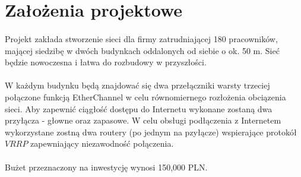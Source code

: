 \section{Założenia projektowe}
\paragraph{}
Projekt zakłada stworzenie sieci dla firmy zatrudniającej 180 pracowników, mającej siedzibę w dwóch budynkach oddalonych od siebie o ok. 50 m. Sieć będzie nowoczesna i łatwa do rozbudowy w przyszłości.

\paragraph{}
W każdym budynku będą znajdować się dwa przełączniki warsty trzeciej połączone funkcją EtherChannel w celu równomiernego rozłożenia obciązenia sieci. Aby zapewnić ciągłość dostępu do Internetu wykonane zostaną dwa przyłącza - głowne oraz zapasowe. W celu obsługi podłączenia z Internetem wykorzystane zostną dwa routery (po jednym na pzyłącze) wspierające protokół $VRRP$ zapewniający niezawodność połączenia.

\paragraph{}
Bużet przeznaczony na inwestycję wynosi 150,000 PLN.

